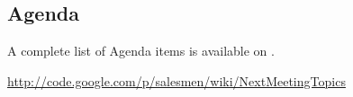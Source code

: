 \documentclass[a4paper, 12pt]{article}
\begin{document}
	\subsection{Agenda}
A complete list of Agenda items is available on \cite{agendaitems}.\\
	
	\begin{thebibliography}{99}
		
		\href{http://code.google.com/p/salesmen/wiki/NextMeetingTopics}{http://code.google.com/p/salesmen/wiki/NextMeetingTopics}
		
	\end{thebibliography}	
		
\end{document}
